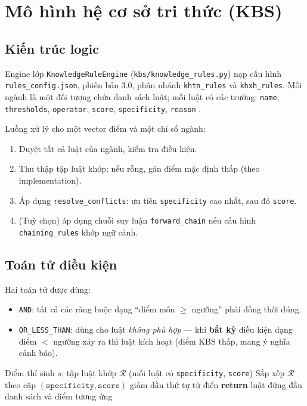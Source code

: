 \chapter{Mô hình hệ cơ sở tri thức (KBS)}

\section{Kiến trúc logic}
Engine lớp \texttt{KnowledgeRuleEngine} (\texttt{kbs/knowledge\_rules.py}) nạp cấu hình \texttt{rules\_config.json}, phiên bản 3.0, phân nhánh \texttt{khtn\_rules} và \texttt{khxh\_rules}. Mỗi ngành là một đối tượng chứa danh sách luật; mỗi luật có các trường: \texttt{name}, \texttt{thresholds}, \texttt{operator}, \texttt{score}, \texttt{specificity}, \texttt{reason} \cite{docs_rules}.

Luồng xử lý cho một vector điểm và một chỉ số ngành:
\begin{enumerate}[leftmargin=*]
  \item Duyệt tất cả luật của ngành, kiểm tra điều kiện.
  \item Thu thập tập luật khớp; nếu rỗng, gán điểm mặc định thấp (theo implementation).
  \item Áp dụng \texttt{resolve\_conflicts}: ưu tiên \texttt{specificity} cao nhất, sau đó \texttt{score}.
  \item (Tuỳ chọn) áp dụng chuỗi suy luận \texttt{forward\_chain} nếu cấu hình \texttt{chaining\_rules} khớp ngữ cảnh.
\end{enumerate}

\section{Toán tử điều kiện}
Hai toán tử được dùng:
\begin{itemize}[leftmargin=*]
  \item \texttt{AND}: tất cả các ràng buộc dạng ``điểm môn $\geq$ ngưỡng'' phải đồng thời đúng.
  \item \texttt{OR\_LESS\_THAN}: dùng cho luật \textit{không phù hợp} --- khi \textbf{bất kỳ} điều kiện dạng điểm $<$ ngưỡng xảy ra thì luật kích hoạt (điểm KBS thấp, mang ý nghĩa cảnh báo).
\end{itemize}

\begin{algorithm}[!htbp]
\caption{Giải quyết xung đột luật (chiến lược \texttt{specificity\_then\_score})}
\label{alg:conflict}
\begin{algorithmic}[1]
\Require Điểm thí sinh $s$; tập luật khớp $\mathcal{R}$ (mỗi luật có \texttt{specificity}, \texttt{score})
\State Sắp xếp $\mathcal{R}$ theo cặp $(\texttt{specificity},\texttt{score})$ giảm dần thứ tự từ điển
\State \textbf{return} luật đứng đầu danh sách và điểm tương ứng
\end{algorithmic}
\end{algorithm}
\FloatBarrier

